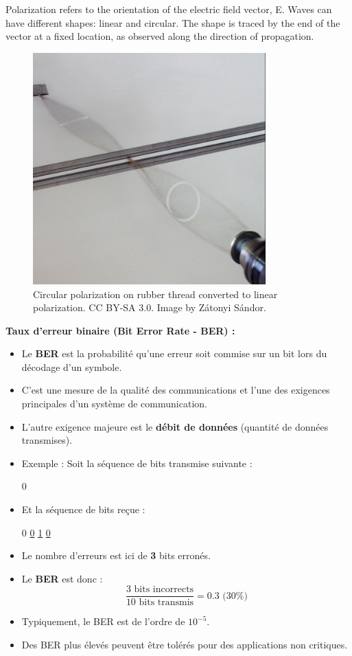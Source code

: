 Polarization refers to the orientation of the electric field vector, E. Waves can have different shapes: linear and circular. The shape is traced by the end of the vector at a fixed location, as observed along the direction of propagation.
\begin{figure}[H] %
    \centering
    \includegraphics[width=0.8\textwidth]{figures/6-47.jpg}
    \caption{Circular polarization on rubber thread converted to linear polarization. CC BY-SA 3.0. Image by Zátonyi Sándor.}
    \label{fig:communication2}
\end{figure}
\textbf{Taux d'erreur binaire (Bit Error Rate - BER) :}
\begin{itemize}
    \item Le \textbf{BER} est la probabilité qu'une erreur soit commise sur un bit lors du décodage d'un symbole.
    \item C'est une mesure de la qualité des communications et l'une des exigences principales d'un système de communication.
    \item L'autre exigence majeure est le \textbf{débit de données} (quantité de données transmises).
    \item Exemple : Soit la séquence de bits transmise suivante :
    \begin{center}
        0         
    \end{center}
    \item Et la séquence de bits reçue :
    \begin{center}
        0 \quad \underline{0}   \quad \underline{1}    \quad \underline{0} 
    \end{center}
    \item Le nombre d'erreurs est ici de \textbf{3} bits erronés.
    \item Le \textbf{BER} est donc : 
    \[
    \frac{3 \text{ bits incorrects}}{10 \text{ bits transmis}} = 0.3 \text{ (30\%)}
    \]
    \item Typiquement, le BER est de l'ordre de \(10^{-5}\).
    \item Des BER plus élevés peuvent être tolérés pour des applications non critiques.
\end{itemize}
